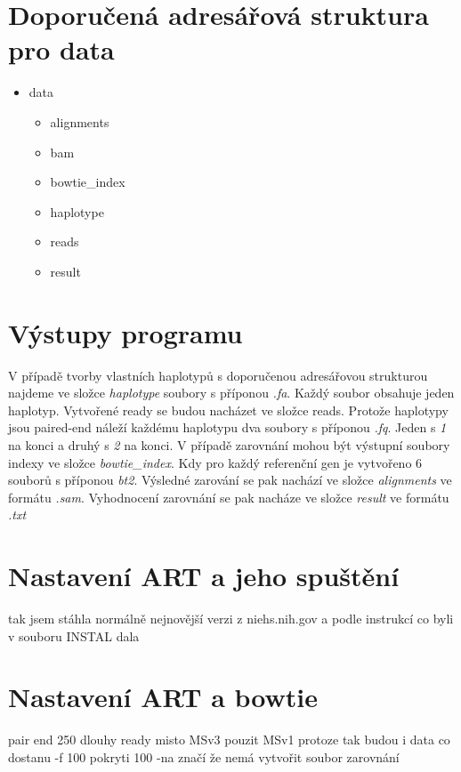 \documentclass[czech,DP]{thesiskiv}
\numberwithin{equation}{section}
\begin{document}
\section{Doporučená adresářová struktura pro data}
\begin{itemize}
	\item data
		\begin{itemize}
			\item alignments
			\item bam
			\item bowtie\_index
			\item haplotype
			\item reads
			\item result
		\end{itemize}
\end{itemize}

\section{Výstupy programu}
V případě tvorby vlastních haplotypů s doporučenou adresářovou strukturou najdeme ve složce \textit{haplotype} soubory s příponou \textit{.fa}. Každý soubor obsahuje jeden haplotyp.
Vytvořené ready se budou nacházet ve složce reads. Protože haplotypy jsou paired-end náleží každému haplotypu dva soubory s příponou \textit{.fq}. Jeden s \textit{1} na konci a druhý s \textit{2} na konci. 
V případě zarovnání mohou být výstupní soubory indexy ve složce \textit{bowtie\_index}. Kdy pro každý referenční gen je vytvořeno 6 souborů s příponou \textit{bt2}. Výsledné zarování se pak nachází ve složce \textit{alignments} ve formátu \textit{.sam}. Vyhodnocení zarovnání se pak nacháze ve složce \textit{result} ve formátu \textit{.txt}

\section{Nastavení ART a jeho spuštění}
tak jsem stáhla normálně nejnovější verzi z niehs.nih.gov a podle instrukcí co byli v souboru INSTAL dala %


\section{Nastavení ART a bowtie}

pair end
250 dlouhy ready
misto MSv3 pouzit MSv1 protoze tak budou i data co dostanu
-f 100 pokryti 100
-na značí že nemá vytvořit soubor zarovnání
\end{document}

